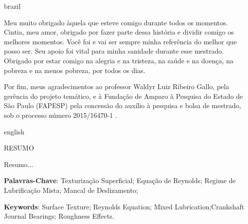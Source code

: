 \begin{otherlanguage*}{brazil}
\begin{agradecimentos}
Meu muito obrigado àquela que esteve comigo durante todos os momentos. Cintia, meu amor, obrigado por fazer parte dessa história e dividir comigo os melhores momentos. Você foi e vai ser sempre minha referência do melhor que posso ser. Seu apoio foi vital para minha sanidade durante esse mestrado. Obrigado por estar comigo na alegria e na tristeza, na saúde e na doença, na pobreza e na menos pobreza, por todos os dias.

Por fim, meus agradecimentos ao professor Waldyr Luiz Ribeiro Gallo, pela gerência do projeto temático, e à Fundação de Amparo à Pesquisa do Estado de São Paulo (FAPESP) pela concessão do auxílio à pesquisa e bolsa de mestrado, sob o processo número 2015/16470-1 .  


\end{agradecimentos}
\end{otherlanguage*}


\begin{otherlanguage*}{english}
	\begin{center}{\ABNTEXchapterfont\ABNTEXchapterfontsize RESUMO}\end{center}

Resumo...

\noindent\textbf{Palavras-Chave}: Texturização Superficial; Equação de Reynolds; Regime de Lubrificação Mista; Mancal de Deslizamento; 

\end{otherlanguage*}

\newpage
\begin{resumo}
	

\vspace{\onelineskip}

\noindent\textbf{Keywords}: Surface Texture; Reynolds Equation; Mixed Lubrication;Crankshaft Journal Bearings; Roughness Effects.

\end{resumo}



